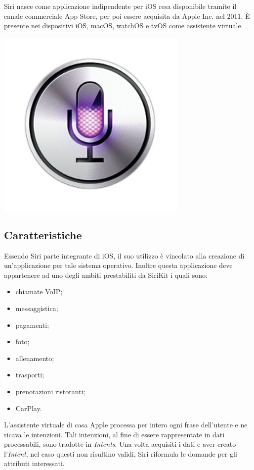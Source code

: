 \documentclass[a4paper,titlepage]{article}
\begin{document}
	\begin{minipage}{0.7\textwidth}\raggedright
		Siri nasce come applicazione indipendente per iOS resa disponibile tramite il canale commerciale App Store, per poi essere acquisita da Apple Inc. nel 2011. È presente nei dispositivi iOS, macOS, watchOS e tvOS come assistente virtuale.
	\end{minipage}
	\hfill
	\noindent\begin{minipage}{0.1\textwidth}
		\includegraphics[scale=0.3]{images/siri.jpg}
	\end{minipage}
	\subsection{Caratteristiche}
		Essendo Siri parte integrante di iOS, il suo utilizzo è vincolato alla creazione di un'applicazione per tale sistema operativo. Inoltre questa applicazione deve appartenere ad uno degli ambiti prestabiliti da SiriKit i quali sono:
			\begin{itemize}
				\item chiamate VoIP;
				\item messaggistica;
				\item pagamenti;
				\item foto;
				\item allenamento;
				\item trasporti;
				\item prenotazioni ristoranti;
				\item CarPlay.
			\end{itemize}
		L'assistente virtuale di casa Apple processa per intero ogni frase dell'utente e ne ricava le intenzioni. Tali intenzioni, al fine di essere rappresentate in dati processabili, sono tradotte in \textit{Intents}. Una volta acquisiti i dati e aver creato l'\textit{Intent}, nel caso questi non risultino validi, Siri riformula le domande per gli attributi interessati.
\newpage
\end{document}
